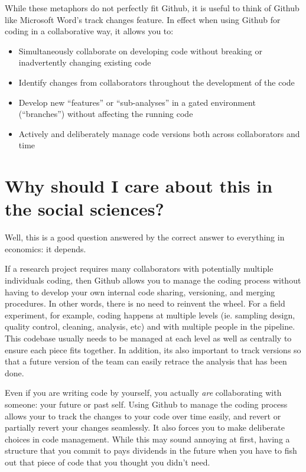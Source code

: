 \documentclass[11pt, oneside]{article}   	%
\begin{document}
While these metaphors do not perfectly fit Github, it is useful to think of Github like Microsoft Word's track changes feature. In effect when using Github for coding in a collaborative way, it allows you to:

\begin{itemize}
\item
Simultaneously collaborate on developing code without breaking or inadvertently changing existing code 
\item 
Identify changes from collaborators throughout the development of the code
\item
Develop new ``features'' or ``sub-analyses'' in a gated environment (``branches'') without affecting the running code
\item
Actively and deliberately manage code versions both across collaborators and time
\end{itemize}

\section{Why should I care about this in the social sciences?}
Well, this is a good question answered by the correct answer to everything in economics: it depends. 

If a research project requires many collaborators with potentially multiple individuals coding, then Github allows you to manage the coding process without having to develop your own internal code sharing, versioning, and merging procedures. In other words, there is no need to reinvent the wheel. For a field experiment, for example, coding happens at multiple levels (ie. sampling design, quality control, cleaning, analysis, etc) and with multiple people in the pipeline. This codebase usually needs to be managed at each level as well as centrally to ensure each piece fits together. In addition, its also important to track versions so that a future version of the team can easily retrace the analysis that has been done.

Even if you are writing code by yourself, you actually \textit{are} collaborating with someone: your future or past self. Using Github to manage the coding process allows your to track the changes to your code over time easily, and revert or partially revert your changes seamlessly. It also forces you to make deliberate choices in code management. While this may sound annoying at first, having a structure that you commit to pays dividends in the future when you have to fish out that piece of code that you thought you didn't need.
\end{document}
